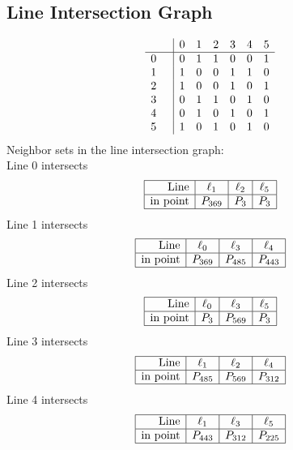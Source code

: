 \documentclass{article}
\begin{document}
{\subsection*{Line Intersection Graph}
{\arraycolsep=1pt
$$
\begin{array}{rr|*{6}r}
 &  & 0 & 1 & 2 & 3 & 4 & 5\\
\hline
0 &  & 0 & 1 & 1 & 0 & 0 & 1\\
1 &  & 1 & 0 & 0 & 1 & 1 & 0\\
2 &  & 1 & 0 & 0 & 1 & 0 & 1\\
3 &  & 0 & 1 & 1 & 0 & 1 & 0\\
4 &  & 0 & 1 & 0 & 1 & 0 & 1\\
5 &  & 1 & 0 & 1 & 0 & 1 & 0\\
\end{array}
$$
}%
Neighbor sets in the line intersection graph:\\
Line 0 intersects 
$$
\begin{array}{|r*{3}{|c}|}
\hline
\mbox{Line}  & \ell_{1} & \ell_{2} & \ell_{5}\\
\hline
\mbox{in point}  & P_{369} & P_{3} & P_{3}\\
\hline
\end{array}
$$
Line 1 intersects 
$$
\begin{array}{|r*{3}{|c}|}
\hline
\mbox{Line}  & \ell_{0} & \ell_{3} & \ell_{4}\\
\hline
\mbox{in point}  & P_{369} & P_{485} & P_{443}\\
\hline
\end{array}
$$
Line 2 intersects 
$$
\begin{array}{|r*{3}{|c}|}
\hline
\mbox{Line}  & \ell_{0} & \ell_{3} & \ell_{5}\\
\hline
\mbox{in point}  & P_{3} & P_{569} & P_{3}\\
\hline
\end{array}
$$
Line 3 intersects 
$$
\begin{array}{|r*{3}{|c}|}
\hline
\mbox{Line}  & \ell_{1} & \ell_{2} & \ell_{4}\\
\hline
\mbox{in point}  & P_{485} & P_{569} & P_{312}\\
\hline
\end{array}
$$
Line 4 intersects 
$$
\begin{array}{|r*{3}{|c}|}
\hline
\mbox{Line}  & \ell_{1} & \ell_{3} & \ell_{5}\\
\hline
\mbox{in point}  & P_{443} & P_{312} & P_{225}\\
\hline
\end{array}
$$}
\end{document}
